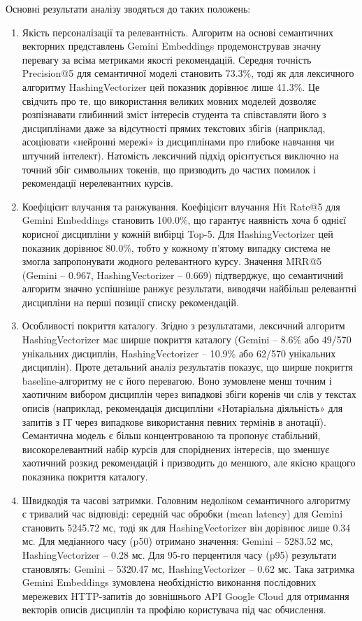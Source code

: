 \documentclass[
]{article}
\begin{document}
Основні результати аналізу зводяться до таких положень:

\begin{enumerate}
\def\labelenumi{\arabic{enumi}.}
\setcounter{enumi}{30}
\item
  Якість персоналізації та релевантність. Алгоритм на основі семантичних
  векторних представлень Gemini Embeddings продемонстрував значну
  перевагу за всіма метриками якості рекомендацій. Середня точність
  Precision@5 для семантичної моделі становить 73.3\%, тоді як для
  лексичного алгоритму HashingVectorizer цей показник дорівнює лише
  41.3\%. Це свідчить про те, що використання великих мовних моделей
  дозволяє розпізнавати глибинний зміст інтересів студента та
  співставляти його з дисциплінами даже за відсутності прямих текстових
  збігів (наприклад, асоціювати «нейронні мережі» із дисциплінами про
  глибоке навчання чи штучний інтелект). Натомість лексичний підхід
  орієнтується виключно на точний збіг символьних токенів, що призводить
  до частих помилок і рекомендації нерелевантних курсів.
\item
  Коефіцієнт влучання та ранжування. Коефіцієнт влучання Hit Rate@5 для
  Gemini Embeddings становить 100.0\%, що гарантує наявність хоча б
  однієї корисної дисципліни у кожній вибірці Top-5. Для
  HashingVectorizer цей показник дорівнює 80.0\%, тобто у кожному
  п'ятому випадку система не змогла запропонувати жодного релевантного
  курсу. Значення MRR@5 (Gemini -- 0.967, HashingVectorizer -- 0.669)
  підтверджує, що семантичний алгоритм значно успішніше ранжує
  результати, виводячи найбільш релевантні дисципліни на перші позиції
  списку рекомендацій.
\item
  Особливості покриття каталогу. Згідно з результатами, лексичний
  алгоритм HashingVectorizer має ширше покриття каталогу (Gemini --
  8.6\% або 49/570 унікальних дисциплін, HashingVectorizer -- 10.9\% або
  62/570 унікальних дисциплін). Проте детальний аналіз результатів
  показує, що ширше покриття baseline-алгоритму не є його перевагою.
  Воно зумовлене менш точним і хаотичним вибором дисциплін через
  випадкові збіги коренів чи слів у текстах описів (наприклад,
  рекомендація дисципліни «Нотаріальна діяльність» для запитів з ІТ
  через випадкове використання певних термінів в анотації). Семантична
  модель є більш концентрованою та пропонує стабільний,
  високорелевантний набір курсів для споріднених інтересів, що зменшує
  хаотичний розкид рекомендацій і призводить до меншого, але якісно
  кращого показника покриття каталогу.
\item
  Швидкодія та часові затримки. Головним недоліком семантичного
  алгоритму є тривалий час відповіді: середній час обробки (mean
  latency) для Gemini становить 5245.72 мс, тоді як для
  HashingVectorizer він дорівнює лише 0.34 мс. Для медіанного часу (p50)
  отримано значення: Gemini -- 5283.52 мс, HashingVectorizer -- 0.28 мс.
  Для 95-го перцентиля часу (p95) результати становлять: Gemini --
  5320.47 мс, HashingVectorizer -- 0.62 мс. Така затримка Gemini
  Embeddings зумовлена необхідністю виконання послідовних мережевих
  HTTP-запитів до зовнішнього API Google Cloud для отримання векторів
  описів дисциплін та профілю користувача під час обчислення.


\end{enumerate}
\end{document}
